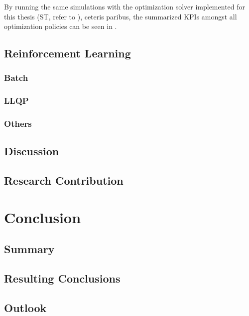 \documentclass{seal_thesis}
\begin{document}
By running the same simulations with the optimization solver implemented for this thesis (\ie ST, refer to ), ceteris paribus, the summarized KPIs amongst all optimization policies can be seen in .


\section{Reinforcement Learning}
\label{sec:rl_results}

\subsection{Batch}


\subsection{LLQP}


\subsection{Others}


\section{Discussion}
\section{Research Contribution}

\chapter{Conclusion}
\label{ch:conclusion}

\section{Summary}
\section{Resulting Conclusions}
\section{Outlook}
\end{document}
